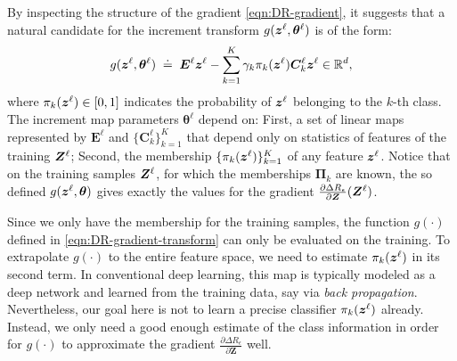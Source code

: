\documentclass[../../book-main.tex]{subfiles}
\begin{document}
By inspecting the structure of the gradient \eqref{eqn:DR-gradient}, it suggests that a natural candidate for the increment transform $g(\bm{z}^\ell, \bm \theta^\ell)$ is of the form:
\begin{equation}
    g(\bm{z}^\ell, \bm \theta^\ell) \; \doteq \; \bm E^\ell \bm{z}^\ell - \sum_{k=1}^K \gamma_{k} \pi_k(\bm{z}^\ell)\bm C_{k}^{\ell}  \bm{z}^{\ell}  \in \mathbb{R}^d,
    \label{eqn:DR-gradient-transform}
\end{equation}
where $\pi_k(\bm{z}^\ell) \in [0,1]$ indicates the probability of $\bm{z}^{\ell}$ belonging to the $k$-th class. The increment map parameters $\bm \theta^\ell$ depend on: First, a set of linear maps represented by $\bm E^{\ell}$ and $\{ \bm C^{\ell}_{k}\}_{k=1}^{K}$ that depend only on statistics of features of the training $\bm{Z}^\ell$; Second, the membership $\{ \pi_k(\bm{z}^\ell)\}_{k=1}^K$ of any feature $\bm{z}^\ell$. 
Notice that on the training samples $\bm{Z}^\ell$, for which the memberships $\bm \Pi_k$ are known,  the so defined $g(\bm{z}^\ell, \bm \theta)$ gives exactly the values for the gradient $\frac{\partial \Delta R_{\epsilon}}{\partial \bm Z}(\bm{Z}^\ell)$.  


Since we only have the membership  for the training samples, the function $g(\cdot)$ defined in \eqref{eqn:DR-gradient-transform} can only be evaluated on the training. To extrapolate $g(\cdot)$ to the entire feature space, we need to estimate $\pi_k(\bm{z}^\ell)$ in its second term. In conventional deep learning, this map is typically modeled as a deep network and learned from the training data, say via {\em back propagation}. Nevertheless, our goal here is not to learn a precise classifier $\pi_{k}(\bm{z}^\ell)$ already. Instead, we only need a good enough estimate of the class information in order for $g(\cdot)$ to approximate the gradient $\frac{\partial \Delta R_{\epsilon}}{\partial \bm Z}$ well. 
\end{document}
